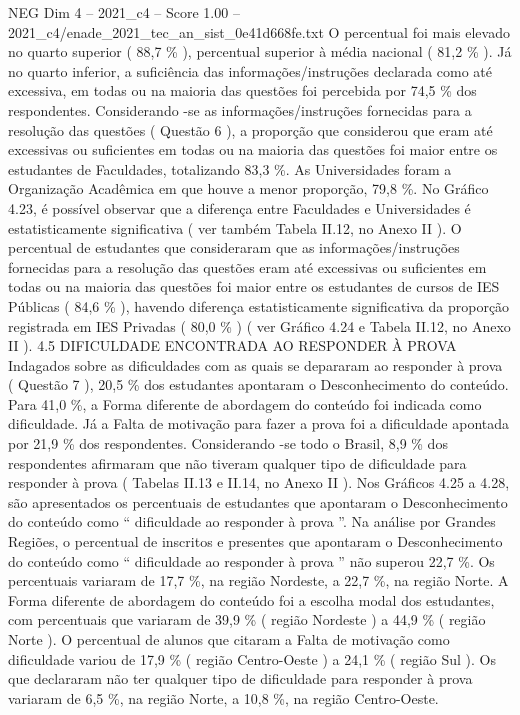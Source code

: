 \begin{textsample}{NEG Dim 4 – 2021\_c4 – Score 1.00 – 2021\_c4/enade\_2021\_tec\_an\_sist\_0e41d668fe.txt}
O percentual foi mais elevado no quarto superior ( 88,7 \% ), percentual superior à média nacional ( 81,2 \% ).
Já no quarto inferior, a suficiência das informações/instruções declarada como até excessiva, em todas ou na maioria das questões foi percebida por 74,5 \% dos respondentes.
Considerando -se as informações/instruções fornecidas para a resolução das questões ( Questão 6 ), a proporção que considerou que eram até excessivas ou suficientes em todas ou na maioria das questões foi maior entre os estudantes de Faculdades, totalizando 83,3 \%.
As Universidades foram a Organização Acadêmica em que houve a menor proporção, 79,8 \%.
No Gráfico 4.23, é possível observar que a diferença entre Faculdades e Universidades é estatisticamente significativa ( ver também Tabela II.12, no Anexo II ).
O percentual de estudantes que consideraram que as informações/instruções fornecidas para a resolução das questões eram até excessivas ou suficientes em todas ou na maioria das questões foi maior entre os estudantes de cursos de IES Públicas ( 84,6 \% ), havendo diferença estatisticamente significativa da proporção registrada em IES Privadas ( 80,0 \% ) ( ver Gráfico 4.24 e Tabela II.12, no Anexo II ). 4.5 DIFICULDADE ENCONTRADA AO RESPONDER À PROVA Indagados sobre as dificuldades com as quais se depararam ao responder à prova ( Questão 7 ), 20,5 \% dos estudantes apontaram o Desconhecimento do conteúdo.
Para 41,0 \%, a Forma diferente de abordagem do conteúdo foi indicada como dificuldade.
Já a Falta de motivação para fazer a prova foi a dificuldade apontada por 21,9 \% dos respondentes.
Considerando -se todo o Brasil, 8,9 \% dos respondentes afirmaram que não tiveram qualquer tipo de dificuldade para responder à prova ( Tabelas II.13 e II.14, no Anexo II ).
Nos Gráficos 4.25 a 4.28, são apresentados os percentuais de estudantes que apontaram o Desconhecimento do conteúdo como “ dificuldade ao responder à prova ”.
Na análise por Grandes Regiões, o percentual de inscritos e presentes que apontaram o Desconhecimento do conteúdo como “ dificuldade ao responder à prova ” não superou 22,7 \%.
Os percentuais variaram de 17,7 \%, na região Nordeste, a 22,7 \%, na região Norte.
A Forma diferente de abordagem do conteúdo foi a escolha modal dos estudantes, com percentuais que variaram de 39,9 \% ( região Nordeste ) a 44,9 \% ( região Norte ).
O percentual de alunos que citaram a Falta de motivação como dificuldade variou de 17,9 \% ( região Centro-Oeste ) a 24,1 \% ( região Sul ).
Os que declararam não ter qualquer tipo de dificuldade para responder à prova variaram de 6,5 \%, na região Norte, a 10,8 \%, na região Centro-Oeste.

\end{textsample}
